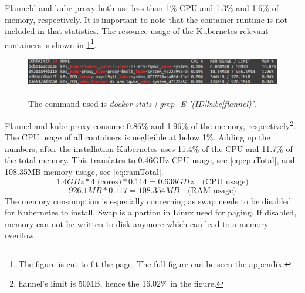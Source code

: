 Flanneld and kube-proxy both use less than 1\% CPU and 1.3\% and 1.6\% of memory, respectively. It is important to note that the container runtime is not included in that statistics. The resource usage of the Kubernetes relevant containers is shown in \cref{fig:kubernetesResourceConsumptionCut}\footnote{The figure is cut to fit the page. The full figure can be seen the appendix.}.
\begin{figure}[h!]
    \centering
    \includegraphics[scale=1.6]{figures/kubeContainerResourceUsageCut.png}
    \vspace*{-0.3cm}
    \caption[The Resource Usage of Kubernetes Containers.]{\\The command used is \textit{docker stats | grep -E '(ID|kube|flannel)'}.}
    \label{fig:kubernetesResourceConsumptionCut}
\end{figure}
Flannel and kube-proxy consume 0.86\% and 1.96\% of the memory, respectively\footnote{flannel's limit is 50MB, hence the 16.02\% in the figure.}. The CPU usage of all containers is negligible at below 1\%. Adding up the numbers, after the installation Kubernetes uses 11.4\% of the CPU and 11.7\% of the total memory. This translates to 0.46GHz CPU usage, see \cref{eq:cpuTotal}, and 108.35MB memory usage, see \cref{eq:ramTotal}.
\begin{equation} \label{eq:cpuTotal}
    1.4GHz * 4 \; \textrm{(cores)} * 0.114 = 0.638GHz  \quad \textrm{(CPU usage)}
  \end{equation}
  \begin{equation} \label{eq:ramTotal}
    926.1MB * 0.117 = 108.354MB  \quad \textrm{(RAM usage)}
  \end{equation}
The memory consumption is especially concerning as swap needs to be disabled for Kubernetes to install. Swap is a partion in Linux used for paging. If disabled, memory can not be written to disk anymore which can lead to a memory overflow.